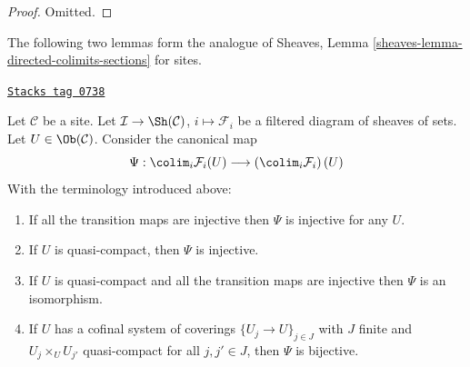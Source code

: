 \begin{proof}
Omitted.
\end{proof}

The following two lemmas form the analogue of
Sheaves, Lemma \ref{sheaves-lemma-directed-colimits-sections}
for sites.

\begin{lemma}
\label{sites-lemma-directed-colimits-sections}
\href{https://stacks.math.columbia.edu/tag/0738}{\texttt{Stacks tag 0738}}

Let $\mathcal{C}$ be a site. Let
$\mathcal{I} \to \Sh(\mathcal{C})$, $i \mapsto \mathcal{F}_i$
be a filtered diagram of sheaves of sets.
Let $U \in \Ob(\mathcal{C})$.
Consider the canonical map
$$
\Psi :
\colim_i \mathcal{F}_i(U)
\longrightarrow
\left(\colim_i \mathcal{F}_i\right)(U)
$$
With the terminology introduced above:
\begin{enumerate}
\item If all the transition maps are injective then
$\Psi$ is injective for any $U$.
\item If $U$ is quasi-compact, then $\Psi$ is injective.
\item If $U$ is quasi-compact and all the transition maps are injective
then $\Psi$ is an isomorphism.
\item If $U$ has a cofinal system of coverings
$\{U_j \to U\}_{j \in J}$ with
$J$ finite and $U_j \times_U U_{j'}$ quasi-compact
for all $j, j' \in J$, then $\Psi$ is bijective.
\end{enumerate}
\end{lemma}

